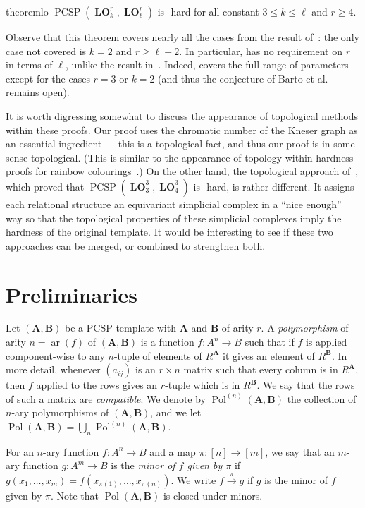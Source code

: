 \documentclass[a4paper,11pt]{article}
\newcommand{\2}{\vec{2}}
\newcommand{\1}{\vec{1}}
\newcommand{\0}{\vec{0}}
\renewcommand{\A}{\ensuremath{\mathbf{A}}}
\newcommand{\B}{\ensuremath{\mathbf{B}}}
\DeclareMathOperator{\ar}{ar}
\DeclareMathOperator{\PCSP}{PCSP}
\DeclareMathOperator{\Pol}{Pol}
\DeclareMathOperator{\LO}{\mathbf{LO}}
\theoremstyle{plain}
\theoremstyle{definition}
\begin{document}
\begin{restatable}{theorem}{lo}\label{thm:lo}
    $\PCSP(\LO^r_k,\LO^r_\ell)$ is \NP-hard for all constant $3\leq k\leq \ell$ and $r\geq 4$.
\end{restatable}

Observe that this theorem covers nearly all the cases from the result
of~\cite{NZ23:toct}: the only case not covered is $k = 2$ and $r \geq \ell + 2$.
In particular,  has no requirement on $r$ in terms of $\ell$,
unlike the result in~\cite{NZ23:toct}. Indeed,  covers the full range of
parameters except for the cases $r = 3$ or $k = 2$ (and thus the conjecture
of Barto et al. remains open).

It is worth digressing somewhat to discuss the appearance of topological methods within these proofs. Our proof uses the chromatic number of the Kneser graph as an essential ingredient --- this is a topological fact, and thus our proof is in some sense topological. (This is similar to the appearance of topology within hardness proofs for rainbow colourings~\cite{ABP20}.) On the other hand, the topological approach of~\cite{fnotw24:stacs}, which proved that $\PCSP(\LO_3^3, \LO_4^3)$ is \NP-hard, is rather different. It assigns each relational structure an equivariant simplicial complex in a ``nice enough'' way so that the topological properties of these simplicial complexes imply the hardness of the original template. It would be interesting to see if these two approaches can be merged, or combined to strengthen both.

\section{Preliminaries}
\label{sec:prelims}

Let $(\A,\B)$ be a PCSP template with $\A$ and $\B$ of arity $r$.
A \emph{polymorphism} of arity $n=\ar(f)$ of $(\A,\B)$ is a function $f:A^n \to B$ such
that if  $f$ is applied component-wise to any $n$-tuple of elements of $R^\A$ it
gives an element of $R^\B$. In more detail, whenever $(a_{ij})$ is an $r\times
n$ matrix such that every column is in $R^\A$, then $f$ applied to the rows
gives an $r$-tuple which is in $R^\B$. We say that the rows of such a matrix are \emph{compatible}.
We denote by $\Pol^{(n)}(\A,\B)$ the collection of $n$-ary polymorphisms of $(\A, \B)$, and we let $\Pol(\A, \B) = \bigcup_n \Pol^{(n)}(\A, \B)$.



For an $n$-ary function $f:A^n \to B$ and a map $\pi : [n] \to [m]$, we say that an $m$-ary function $g:A^m\to B$ is the \emph{minor of $f$ given by $\pi$} if $g(x_1,\ldots,x_m) = f(x_{\pi(1)},\ldots,x_{\pi(n)})$.
We write $f \xrightarrow{\pi} g$ if $g$ is the minor of $f$ given by $\pi$. Note that $\Pol(\A,\B)$ is closed under minors.
\end{document}
